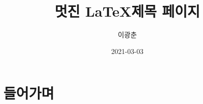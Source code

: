 \documentclass[]{article}
\title{멋진 \LaTeX 제목 페이지}
\author{이광춘}
\date{2021-03-03}
\begin{document}
\maketitle

\begin{abstract}

\jiwon[1]

\end{abstract}

\section{들어가며}

\jiwon
\end{document}
